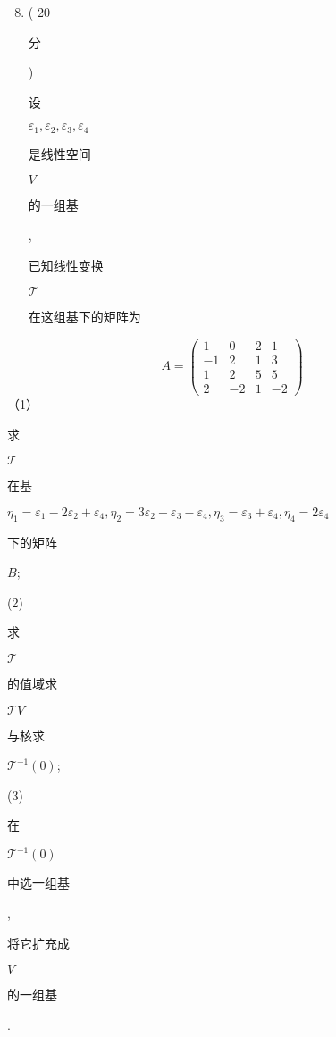 \documentclass[10pt]{article}
\begin{document}
\begin{enumerate}
  \setcounter{enumi}{7}
  \item ( 20 \begin{CJK}{UTF8}{mj}分\end{CJK}) \begin{CJK}{UTF8}{mj}设\end{CJK} $\varepsilon_{1}, \varepsilon_{2}, \varepsilon_{3}, \varepsilon_{4}$ \begin{CJK}{UTF8}{mj}是线性空间\end{CJK} $V$ \begin{CJK}{UTF8}{mj}的一组基\end{CJK}, \begin{CJK}{UTF8}{mj}已知线性变换\end{CJK} $\mathcal{T}$ \begin{CJK}{UTF8}{mj}在这组基下的矩阵为\end{CJK}
\end{enumerate}
$$
A=\left(\begin{array}{cccc}
1 & 0 & 2 & 1 \\
-1 & 2 & 1 & 3 \\
1 & 2 & 5 & 5 \\
2 & -2 & 1 & -2
\end{array}\right)
$$
（1）\begin{CJK}{UTF8}{mj}求\end{CJK} $\mathcal{T}$ \begin{CJK}{UTF8}{mj}在基\end{CJK} $\eta_{1}=\varepsilon_{1}-2 \varepsilon_{2}+\varepsilon_{4}, \eta_{2}=3 \varepsilon_{2}-\varepsilon_{3}-\varepsilon_{4}, \eta_{3}=\varepsilon_{3}+\varepsilon_{4}, \eta_{4}=2 \varepsilon_{4}$ \begin{CJK}{UTF8}{mj}下的矩阵\end{CJK} $B$;

(2) \begin{CJK}{UTF8}{mj}求\end{CJK} $\mathcal{T}$ \begin{CJK}{UTF8}{mj}的值域求\end{CJK} $\mathcal{T} V$ \begin{CJK}{UTF8}{mj}与核求\end{CJK} $\mathcal{T}^{-1}(0)$;

(3) \begin{CJK}{UTF8}{mj}在\end{CJK} $\mathcal{T}^{-1}(0)$ \begin{CJK}{UTF8}{mj}中选一组基\end{CJK}, \begin{CJK}{UTF8}{mj}将它扩充成\end{CJK} $V$ \begin{CJK}{UTF8}{mj}的一组基\end{CJK}.
\end{document}
